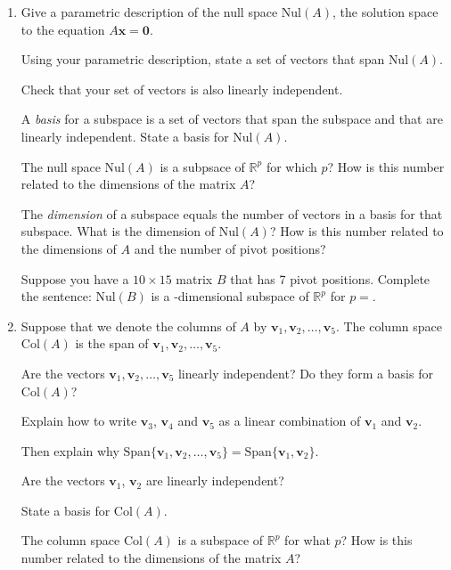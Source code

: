 \documentclass[12pt]{article}
\newcommand{\vs}[1]{\vspace{#1in}}
\newcommand{\vvec}{{\mathbf v}}
\newcommand{\xvec}{{\mathbf x}}
\newcommand{\zerovec}{{\mathbf 0}}
\newcommand{\real}{{\mathbb R}}
\renewcommand{\span}[1]{\text{Span}\{#1\}}
\newcommand{\col}{\text{Col}}
\newcommand{\nul}{\text{Nul}}
\begin{document}
\begin{enumerate}
\item   Give a parametric description of the null space $\nul(A)$, the
  solution space to the equation $A\xvec=\zerovec$.

  \vs{1.5}
  Using your parametric description, state a set of vectors that span
  $\nul(A)$.

  \vs{1.5}
  Check that your set of vectors is also linearly independent.

  \vs{1.5}
  A {\em basis} for a subspace is a set of vectors that span the
  subspace and that are linearly independent.  State a basis for
  $\nul(A)$.

  \vs{1}
  \newpage
  The null space $\nul(A)$ is a subpsace of $\real^p$ for which $p$?
  How is this number related to the dimensions of the matrix $A$?

  \vs{1}
  The {\em dimension} of a subspace equals the number of vectors in a
  basis for that subspace.  What is the dimension of $\nul(A)$?  How
  is this number related to the dimensions of $A$ and the number of
  pivot positions?

  \vs{1}
  Suppose you have a $10\times 15$ matrix $B$ that has 7 pivot
  positions.  Complete the sentence:
  $\nul(B)$ is a \underline{\hspace*{1in}}-dimensional subspace of
  $\real^p$ for $p = $\underline{\hspace*{1in}}.

  \vs{0.25}
\item Suppose that we denote the columns of $A$ by
  $\vvec_1,\vvec_2,\ldots,\vvec_5$.  The column space $\col(A)$ is the
  span of $\vvec_1,\vvec_2,\ldots,\vvec_5$.

  \medskip
  Are the vectors $\vvec_1, \vvec_2,\ldots,\vvec_5$ linearly
  independent?  Do they form a basis for $\col(A)$?

  \vs{1}
  Explain how to write $\vvec_3$, $\vvec_4$ and $\vvec_5$ as a linear
  combination of $\vvec_1$ and $\vvec_2$.

  \vs{1.5}
  Then explain why $\span{\vvec_1,\vvec_2,\ldots,\vvec_5} =
  \span{\vvec_1,\vvec_2}$.

  \vs{1.25}
  Are the vectors $\vvec_1$, $\vvec_2$ are linearly independent?

  \vs{1}
  State a basis for $\col(A)$.

  \vs{1}
  The column space $\col(A)$ is a subspace of $\real^p$ for what $p$?
  How is this number related to the dimensions of the matrix $A$?


\end{enumerate}
\end{document}
